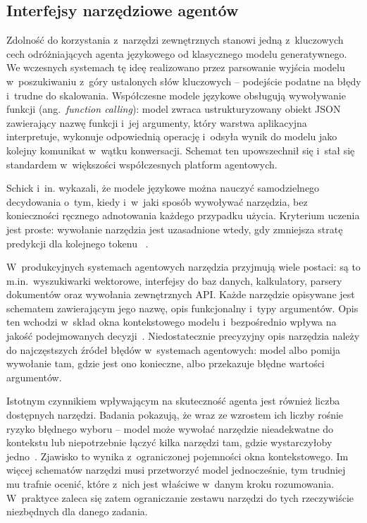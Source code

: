 \clearpage{}

\subsection{Interfejsy narzędziowe agentów}\label{subsec:interfejsy-narzedziowe-agentow}

Zdolność do korzystania z~narzędzi zewnętrznych stanowi jedną z~kluczowych cech
odróżniających agenta językowego od klasycznego modelu generatywnego. We
wczesnych systemach tę ideę realizowano przez parsowanie wyjścia modelu
w~poszukiwaniu z~góry ustalonych słów kluczowych -- podejście podatne na błędy
i~trudne do skalowania. Współczesne modele językowe obsługują wywoływanie
funkcji (ang.~\textit{function calling}): model zwraca ustrukturyzowany obiekt
JSON zawierający nazwę funkcji i~jej argumenty, który warstwa aplikacyjna
interpretuje, wykonuje odpowiednią operację i~odsyła wynik do modelu jako
kolejny komunikat w~wątku konwersacji. Schemat ten upowszechnił się i~stał się
standardem w~większości współczesnych platform agentowych.

Schick i~in. wykazali, że modele językowe można nauczyć samodzielnego
decydowania o~tym, kiedy i~w~jaki sposób wywoływać narzędzia, bez konieczności
ręcznego adnotowania każdego przypadku użycia. Kryterium uczenia jest proste:
wywołanie narzędzia jest uzasadnione wtedy, gdy zmniejsza stratę predykcji dla
kolejnego tokenu ~\cite{schick2023toolformer}.

W~produkcyjnych systemach agentowych narzędzia przyjmują wiele postaci: są to
m.in.\ wyszukiwarki wektorowe, interfejsy do baz danych, kalkulatory, parsery
dokumentów oraz wywołania zewnętrznych API. Każde narzędzie opisywane jest
schematem zawierającym jego nazwę, opis funkcjonalny i~typy argumentów. Opis
ten wchodzi w~skład okna kontekstowego modelu i~bezpośrednio wpływa na jakość
podejmowanych decyzji~\cite{wang2024survey, patil2024gorilla}. Niedostatecznie
precyzyjny opis narzędzia należy do najczęstszych źródeł błędów w~systemach
agentowych: model albo pomija wywołanie tam, gdzie jest ono konieczne, albo
przekazuje błędne wartości argumentów.

Istotnym czynnikiem wpływającym na skuteczność agenta jest również liczba
dostępnych narzędzi. Badania pokazują, że wraz ze wzrostem ich liczby rośnie
ryzyko błędnego wyboru -- model może wywołać narzędzie nieadekwatne do
kontekstu lub niepotrzebnie łączyć kilka narzędzi tam, gdzie wystarczyłoby
jedno~\cite{qin2024toolllm}. Zjawisko to wynika z~ograniczonej pojemności okna
kontekstowego. Im więcej schematów narzędzi musi przetworzyć model
jednocześnie, tym trudniej mu trafnie ocenić, które z~nich jest właściwe
w~danym kroku rozumowania. W~praktyce zaleca się zatem ograniczanie zestawu
narzędzi do tych rzeczywiście niezbędnych dla danego zadania.

